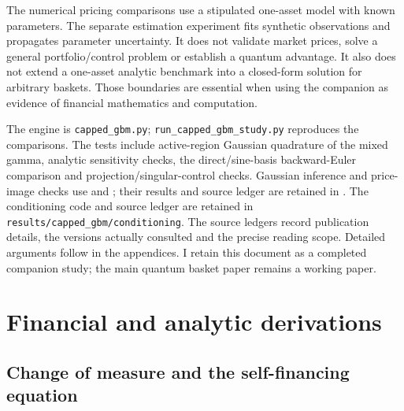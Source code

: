 \documentclass[11pt]{article}
\begin{document}
The numerical pricing comparisons use a stipulated one-asset model with
known parameters. The separate estimation experiment fits synthetic
observations and propagates parameter uncertainty. It does not validate
market prices, solve a general portfolio/control problem or establish a
quantum advantage.
It also does not extend a one-asset analytic benchmark into a closed-form
solution for arbitrary baskets. Those boundaries are essential when
using the companion as evidence of financial mathematics and computation.

The engine is \texttt{capped\_gbm.py};
\texttt{run\_capped\_gbm\_study.py} reproduces the comparisons.
The tests include active-region Gaussian quadrature of the mixed gamma,
analytic sensitivity checks, the direct/sine-basis backward-Euler comparison
and projection/singular-control checks. Gaussian inference and price-image
checks use  and
; their results and source ledger are
retained in . The conditioning
code and source ledger are retained in \texttt{results/capped\_gbm/conditioning}. The source ledgers record publication details, the versions actually
consulted and the precise reading scope. Detailed arguments follow in
the appendices. I retain this document as a completed companion study;
the main quantum basket paper remains a working paper.

\appendix


\section{Financial and analytic derivations}
\label{app:cgbm-financial}

\subsection{Change of measure and the self-financing equation}
\end{document}
